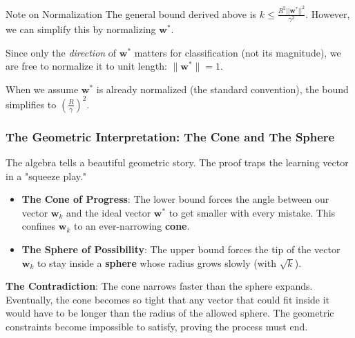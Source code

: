 \begin{block}{Note on Normalization}
The general bound derived above is \(k \leq \frac{R^2 ||\mathbf{w}^*||^2}{\gamma^2}\). However, we can simplify this by normalizing \(\mathbf{w}^*\).

Since only the \textit{direction} of \(\mathbf{w}^*\) matters for classification (not its magnitude), we are free to normalize it to unit length: \(\|\mathbf{w}^*\| = 1\).



When we assume \(\mathbf{w}^*\) is already normalized (the standard convention), the bound simplifies to \(\left(\frac{R}{\gamma}\right)^2\).
\end{block}

\subsubsection{The Geometric Interpretation: The Cone and The Sphere}

The algebra tells a beautiful geometric story. The proof traps the learning vector in a "squeeze play."

\begin{itemize}
    \item \textbf{The Cone of Progress}: The lower bound forces the angle between our vector \(\mathbf{w}_k\) and the ideal vector \(\mathbf{w}^*\) to get smaller with every mistake. This confines \(\mathbf{w}_k\) to an ever-narrowing \textbf{cone}.

    \item \textbf{The Sphere of Possibility}: The upper bound forces the tip of the vector \(\mathbf{w}_k\) to stay inside a \textbf{sphere} whose radius grows slowly (with \(\sqrt{k}\)).
\end{itemize}

\textbf{The Contradiction}: The cone narrows faster than the sphere expands. Eventually, the cone becomes so tight that any vector that could fit inside it would have to be longer than the radius of the allowed sphere. The geometric constraints become impossible to satisfy, proving the process must end.

